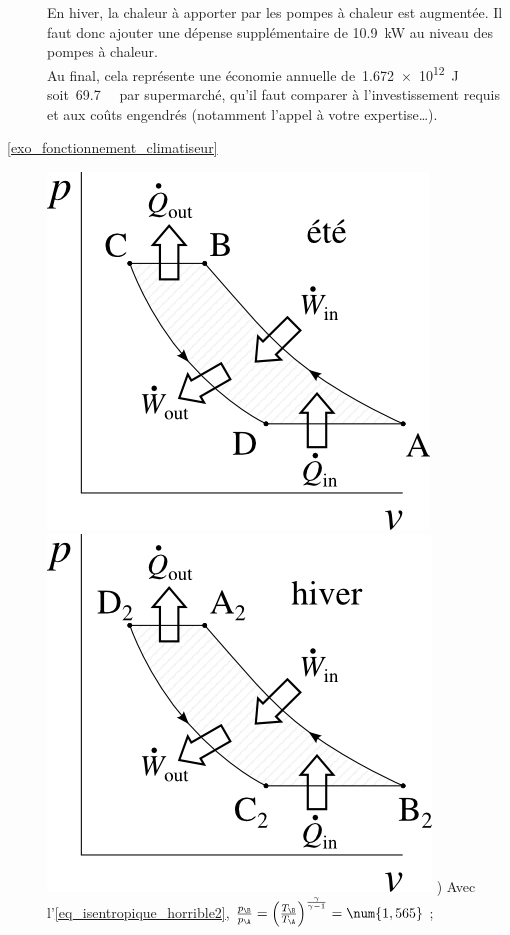 \begin{description}
			En hiver, la chaleur à apporter par les pompes à chaleur est augmentée. Il faut donc ajouter une dépense supplémentaire de \SI{10,9}{\kilo\watt} au niveau des pompes à chaleur.\\
			Au final, cela représente une économie annuelle de~\SI{1,672e12}{\joule} soit~\SI{69,7}{\kilo\euroo} par supermarché, qu’il faut comparer à l’investissement requis et aux coûts engendrés (notamment l’appel à votre expertise…).
	\item [\ref{exo_fonctionnement_climatiseur}]
				\includegraphics[height=\solutiondiagramwidth]{images/exo_sol_pv_climatiseur.png}
				\includegraphics[height=\solutiondiagramwidth]{images/exo_sol_pv_thermopompe.png}
				) Avec l’\cref{eq_isentropique_horrible2}, $\frac{p_\B }{p_\A} = \left(\frac{T_\B}{T_\A}\right)^{\frac{\gamma}{\gamma - 1}} = \num{1,565}$ ;

\end{description}
